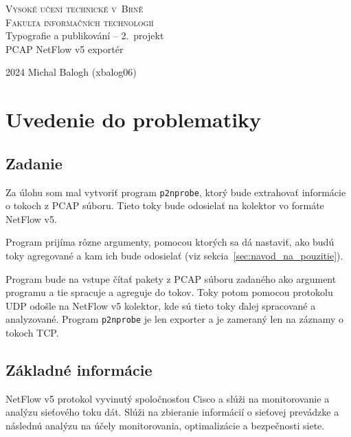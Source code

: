 \documentclass[a4paper, 12pt]{article}
\begin{document}
\begin{titlepage}
	\begin{center}
		{\Huge 
        \textsc{Vysoké učení technické v~Brně}\\[0.5em]}
		{\huge 
        \textsc{Fakulta informačních technologií}}\\
		{\LARGE 
        Typografie a publikování -- 2.\ projekt\\[0.6em]
		PCAP NetFlow v5 exportér }
	\end{center}
	{\Large 2024 \hfill 
    Michal Balogh (xbalog06) }
\end{titlepage}

\tableofcontents

\newpage

\section{Uvedenie do problematiky}

\subsection{Zadanie}

Za úlohu som mal vytvoriť program \texttt{p2nprobe}, ktorý bude extrahovať informácie o tokoch z PCAP súboru. Tieto toky bude odosielať na kolektor vo formáte NetFlow v5.

Program prijíma rôzne argumenty, pomocou ktorých sa dá nastaviť, ako budú toky agregované a kam ich bude odosielať (viz sekcia~\ref{sec:navod_na_pouzitie}).

Program bude na vstupe čítať pakety z PCAP súboru zadaného ako argument programu a tie spracuje a agreguje do tokov. Toky potom pomocou protokolu UDP odošle na NetFlow v5 kolektor, kde sú tieto toky ďalej spracované a analyzované. Program \texttt{p2nprobe} je len exporter a je zameraný len na záznamy o tokoch TCP.

\subsection{Základné informácie}

NetFlow v5 protokol vyvinutý spoločnosťou Cisco a slúži na monitorovanie a analýzu sieťového toku dát. Slúži na zbieranie informácií o sieťovej prevádzke a následnú analýzu na účely monitorovania, optimalizácie a bezpečnosti siete.
\end{document}
